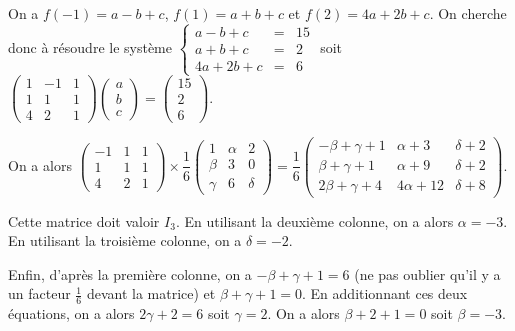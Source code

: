 \documentclass[11pt,fleqn]{book} %
\begin{document}
\begin{solution}

On a $f(-1)=a-b+c$, $f(1)=a+b+c$ et $f(2)=4a+2b+c$. On cherche donc à résoudre le système $\left\{\begin{array}{rcl}a-b+c&=&15\\a+b+c&=&2\\4a+2b+c&=&6\end{array}\right.$ soit $\begin{pmatrix}1 & -1 & 1 \\ 1 & 1& 1 \\ 4 & 2 & 1\end{pmatrix}\begin{pmatrix}a \\ b \\c \end{pmatrix} = \begin{pmatrix}15\\2\\6\end{pmatrix}$.

On a alors $\begin{pmatrix}-1 & 1 & 1 \\ 1 & 1& 1 \\ 4 & 2 & 1\end{pmatrix} \times \dfrac{1}{6}\begin{pmatrix}1 & \alpha & 2 \\ \beta & 3 & 0 \\ \gamma & 6 & \delta \end{pmatrix} = \dfrac{1}{6}\begin{pmatrix}-\beta+\gamma+1 & \alpha+3 & \delta+2 \\ \beta + \gamma + 1 & \alpha + 9 & \delta + 2 \\ 2\beta + \gamma +4 & 4\alpha + 12 & \delta + 8\end{pmatrix}$.

Cette matrice doit valoir $I_3$. En utilisant la deuxième colonne, on a alors $\alpha = -3$. En utilisant la troisième colonne, on a $\delta= -2$.

Enfin, d'après la première colonne, on a $-\beta  +\gamma +1=6$ (ne pas oublier qu'il y a un facteur $\frac{1}{6}$ devant la matrice) et $\beta + \gamma + 1=0$. En additionnant ces deux équations, on a alors $2\gamma + 2=6$ soit $\gamma =2$. On a alors $\beta + 2+1=0$ soit $\beta = -3$.


\end{solution}
\end{document}
